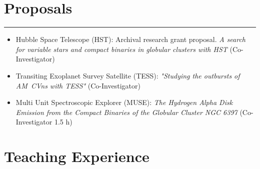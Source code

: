 \documentclass[letterpaper,10pt]{article}
\begin{document}
\begin{comment}
\subsection*{Media Coverage}

\begin{itemize}[label=$\blacktriangleright$]

\item \hyperref[https://phys.org/news/2017-03-planetary-earth-sun.html]{Planetary waves, first found on Earth, are discovered on Sun (phys.org)}

\end{itemize}
\end{comment}
\section*{Proposals}       

\hrule
\vspace{.3 cm}


  \begin{itemize}[label=$\blacktriangleright$]
      \item Hubble Space Telescope (HST):  Archival research grant proposal. \emph{A search for variable stars and compact binaries in globular clusters with HST } (Co-Investigator)
  \end{itemize}
  
  

\begin{itemize}[label=$\blacktriangleright$]
      \item   Transiting Exoplanet Survey Satellite (TESS): \emph{"Studying the outbursts of AM~CVns with TESS"} (Co-Investigator)
  \end{itemize}


  \begin{itemize}[label=$\blacktriangleright$]
        \item Multi Unit Spectroscopic Explorer (MUSE): \emph{The Hydrogen Alpha Disk Emission from the Compact Binaries of the Globular Cluster NGC 6397} (Co-Investigator 1.5 h)
  \end{itemize}


\section*{Teaching Experience}
\end{document}
